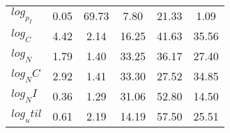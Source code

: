 \begin{center}
\begin{longtable}{lccccc}
$log_p_I   $	 & 	        0.05	 & 	       69.73	 & 	        7.80	 & 	       21.33	 & 	        1.09 \\ 
$log_C     $	 & 	        4.42	 & 	        2.14	 & 	       16.25	 & 	       41.63	 & 	       35.56 \\ 
$log_N     $	 & 	        1.79	 & 	        1.40	 & 	       33.25	 & 	       36.17	 & 	       27.40 \\ 
$log_NC    $	 & 	        2.92	 & 	        1.41	 & 	       33.30	 & 	       27.52	 & 	       34.85 \\ 
$log_NI    $	 & 	        0.36	 & 	        1.29	 & 	       31.06	 & 	       52.80	 & 	       14.50 \\ 
$log_util  $	 & 	        0.61	 & 	        2.19	 & 	       14.19	 & 	       57.50	 & 	       25.51 \\ 
\end{longtable}
 \end{center}
